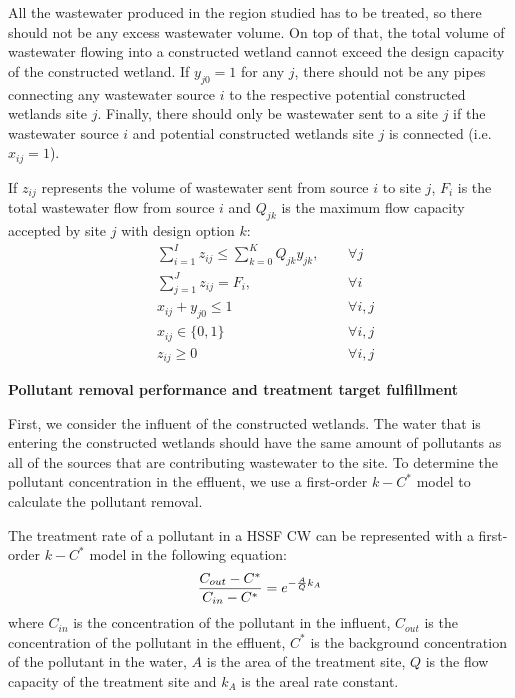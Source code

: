 \documentclass[preprint,12pt,authoryear]{elsarticle}
\begin{document}
All the wastewater produced in the region studied has to be treated, so there should not be any excess wastewater volume. On top of that, the total volume of wastewater flowing into a constructed wetland cannot exceed the design capacity of the constructed wetland. If $y_{j0} = 1$ for any $j$, there should not be any pipes connecting any wastewater source $i$ to the respective potential constructed wetlands site $j$. Finally, there should only be wastewater sent to a site $j$ if the wastewater source $i$ and potential constructed wetlands site $j$ is connected (i.e. $x_{ij} = 1$). 

If $z_{ij}$ represents the volume of wastewater sent from source $i$ to site $j$, $F_{i}$ is the total wastewater flow from source $i$ and $Q_{jk}$ is the maximum flow capacity accepted by site $j$ with design option $k$:
\begin{align}
	&\sum_{i=1}^{I}z_{ij}\leq \sum_{k=0}^{K}Q_{jk}y_{jk},~~ &&\forall j\\
	&\sum_{j=1}^J z_{ij} = F_i,&&\forall i\\
	&x_{ij} + y_{j0} \leq 1 && \forall i,j \\
	&x_{ij}\in\{0,1\}&&\forall i,j\\
	&z_{ij} \geq 0 && \forall i,j %
\end{align}

\noindent\textbf{Pollutant removal performance and treatment target fulfillment} 

First, we consider the influent of the constructed wetlands. The water that is entering the constructed wetlands should have the same amount of pollutants as all of the sources that are contributing wastewater to the site. To determine the pollutant concentration in the effluent, we use a first-order $k-C^*$ model \citep{rousseau2004model} to calculate the pollutant removal. 

The treatment rate of a pollutant in a HSSF CW can be represented with a first-order $k-C^*$ model in the following equation:
\begin{equation}
	\label{eqn:plugflow}
	\frac{C_{out} - C^*}{C_{in} - C^*} = e^{-\frac{A}{Q}k_A}\\
\end{equation}
where $C_{in}$ is the concentration of the pollutant in the influent, $C_{out}$ is the concentration of the pollutant in the effluent, $C^*$ is the background concentration of the pollutant in the water, $A$ is the area of the treatment site, $Q$ is the flow capacity of the treatment site and $k_A$ is the areal rate constant.
\end{document}
